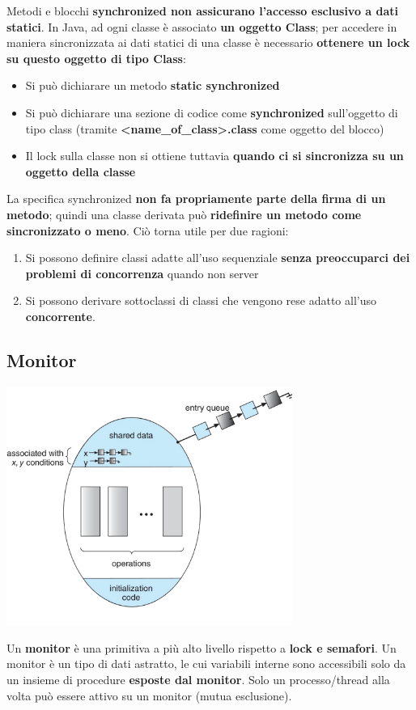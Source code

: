 \documentclass[12pt]{article}
\begin{document}
Metodi e blocchi \textbf{synchronized non assicurano l'accesso esclusivo a dati statici}. In Java, ad ogni classe è associato \textbf{un oggetto Class}; per accedere in maniera sincronizzata ai dati statici di una classe è necessario \textbf{ottenere un lock su questo oggetto di tipo Class}:
\begin{itemize}
    \item Si può dichiarare un metodo \textbf{static synchronized}
    \item Si può dichiarare una sezione di codice come \textbf{synchronized} sull'oggetto di tipo class (tramite \textbf{<name\_of\_class>.class} come oggetto del blocco)
    \item Il lock sulla classe non si ottiene tuttavia \textbf{quando ci si sincronizza su un oggetto della classe}
\end{itemize}
La specifica synchronized \textbf{non fa propriamente parte della firma di un metodo}; quindi una classe derivata può \textbf{ridefinire un metodo come sincronizzato o meno}. Ciò torna utile per due ragioni:
\begin{enumerate}
    \item Si possono definire classi adatte all'uso sequenziale \textbf{senza preoccuparci dei problemi di concorrenza} quando non server
    \item Si possono derivare sottoclassi di classi che vengono rese adatto all'uso \textbf{concorrente}.
\end{enumerate}
\subsection{Monitor}
\begin{center}
    \includegraphics[width = 0.70\textwidth]{Images/84.png}
\end{center}
Un \textbf{monitor} è una primitiva a più alto livello rispetto a \textbf{lock e semafori}. Un monitor è un tipo di dati astratto, le cui variabili interne sono accessibili solo da un insieme di procedure \textbf{esposte dal monitor}. Solo un processo/thread alla volta può essere attivo su un monitor (mutua esclusione).
\end{document}
